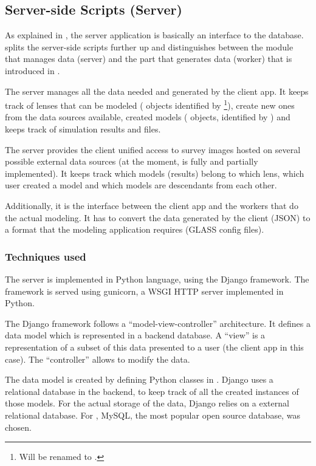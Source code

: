 \subsection{Server-side Scripts (Server)}
\label{sec:server}

As explained in , the server application is basically an interface to the database.
\spl splits the server-side scripts further up and distinguishes between the module that manages data (server) and the part that generates data (worker) that is introduced in .

The server manages all the data needed and generated by the client app.
It keeps track of lenses that can be modeled ( objects identified by \footnote{Will be renamed to .}), create new ones from the data sources available, created models ( objects, identified by ) and keeps track of simulation results and files.

The server provides the client unified access to survey images hosted on several possible external data sources (at the moment, \sw is fully and \ml partially implemented).
It keeps track which models (results) belong to which lens, which user created a model and which models are descendants from each other.

Additionally, it is the interface between the client app and the workers that do the actual modeling.
It has to convert the data generated by the client (JSON) to a format that the modeling application requires (GLASS config files).


\subsubsection{Techniques used}

The server is implemented in Python language, using the Django framework.
The framework is served using gunicorn, a WSGI HTTP server implemented in Python.

The Django framework follows a ``model-view-controller'' architecture.
It defines a data model which is represented in a backend database.
A ``view'' is a representation of a subset of this data presented to a user (the client app in this case).
The ``controller'' allows to modify the data.

The data model is created by defining Python classes in .
Django uses a relational database in the backend, to keep track of all the created instances of those models.
For the actual storage of the data, Django relies on a external relational database.
For \spl, MySQL, the most popular\cite{dbranking} open source database, was chosen.

